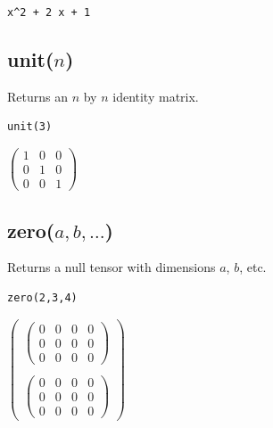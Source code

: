 \documentclass[12pt]{article}
\begin{document}
\verb$x^2 + 2 x + 1$

\subsection*{unit($n$)}

Returns an $n$ by $n$ identity matrix.

{\color{blue}
\begin{verbatim}
unit(3)
\end{verbatim}
}

$\displaystyle
\begin{pmatrix}
1 & 0 & 0
\\[1ex]
0 & 1 & 0
\\[1ex]
0 & 0 & 1
\end{pmatrix}
$

\subsection*{zero($a,b,\ldots$)}

Returns a null tensor with dimensions $a$, $b$, etc.

{\color{blue}
\begin{verbatim}
zero(2,3,4)
\end{verbatim}
}

$
\begin{pmatrix}
\begin{pmatrix}0&0&0&0\\0&0&0&0\\0&0&0&0\end{pmatrix}
\\
\\
\begin{pmatrix}0&0&0&0\\0&0&0&0\\0&0&0&0\end{pmatrix}
\end{pmatrix}
$
\end{document}

